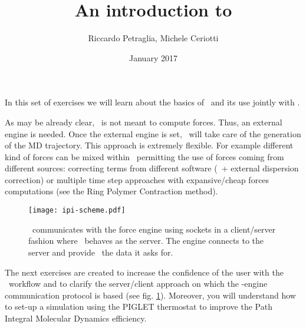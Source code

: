 \documentclass{article}
\title{An introduction to \ipi{}}
\author{Riccardo Petraglia, Michele Ceriotti}
\date{January 2017}
\begin{document}
\maketitle

In this set of exercises we will learn about the basics of \ipi\ and
its use jointly with \qe.

As may be already clear, \ipi\ is not meant to compute forces. Thus,
an external engine is needed. Once the external engine is set, \ipi\
will take care of the generation of the MD trajectory. This approach
is extremely flexible. For example different kind of forces can be
mixed within \ipi\ permitting the use of forces coming from different
sources: correcting terms from different software (\PWscf~+ external
dispersion correction) or multiple time step approaches with
expansive/cheap forces computations (see the Ring Polymer Contraction
method).

\begin{figure}[h!]
\centering
\texttt{[image: ipi-scheme.pdf]}
\caption{\ipi\ communicates with the force engine using sockets in a
  client/server fashion where \ipi\ behaves as the server. The engine
  connects to the server and provide \ipi\ the data it asks
  for.}\label{fig:ipi-scheme}
\end{figure}


The next exercises are created to increase the confidence of the user
with the \ipi\ workflow and to clarify the server/client approach on
which the \ipi-engine communication protocol is based (see
fig. \ref{fig:ipi-scheme}). Moreover, you will understand how to
set-up a simulation using the PIGLET thermostat to improve the Path
Integral Molecular Dynamics efficiency.
\end{document}
